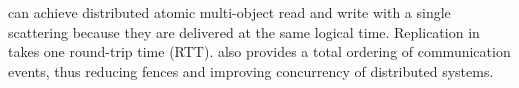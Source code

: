 \sys{} can achieve distributed atomic multi-object read and write with a single scattering because they are delivered at the same logical time. Replication in \sys{} takes one round-trip time (RTT). \sys{} also provides a total ordering of communication events, thus reducing fences and improving concurrency of distributed systems.




